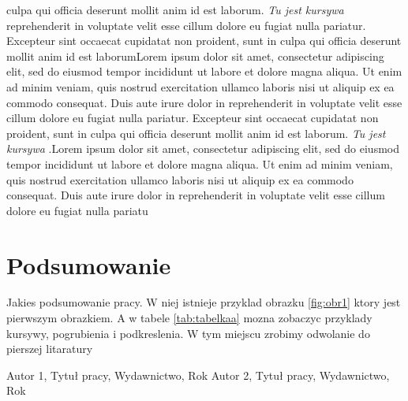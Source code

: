 \documentclass[12pt,a4paper,titlepage]{article}
\begin{document}
culpa qui officia deserunt mollit anim id est laborum.  \textit{Tu jest kursywa} reprehenderit in voluptate velit esse cillum dolore eu fugiat nulla pariatur. Excepteur sint occaecat cupidatat non proident, sunt in culpa qui officia deserunt mollit anim id est laborumLorem ipsum dolor sit amet, consectetur adipiscing elit, sed do eiusmod tempor incididunt ut labore et dolore magna aliqua.  Ut enim ad minim veniam, quis nostrud exercitation ullamco laboris nisi ut aliquip ex ea commodo consequat. Duis aute irure dolor in reprehenderit in voluptate velit esse cillum dolore eu fugiat nulla pariatur. Excepteur sint occaecat cupidatat non proident, sunt in culpa qui officia deserunt mollit anim id est laborum.  \textit{Tu jest kursywa} .Lorem ipsum dolor sit amet, consectetur adipiscing elit, sed do eiusmod tempor incididunt ut labore et dolore magna aliqua. Ut enim ad minim veniam, quis nostrud exercitation ullamco laboris nisi ut aliquip ex ea commodo consequat. Duis aute irure dolor in reprehenderit 
\cite{autor2} in voluptate velit esse cillum dolore eu fugiat nulla pariatu




\section{Podsumowanie}

Jakies podsumowanie pracy. W niej istnieje przyklad obrazku  \ref{fig:obr1} ktory jest pierwszym obrazkiem. A w tabele \ref{tab:tabelkaa}  mozna zobaczyc przyklady kursywy, pogrubienia i podkreslenia. W tym miejscu zrobimy odwolanie do pierszej litaratury \cite{autor1}


\begin{thebibliography}{2}
 Autor 1, Tytuł pracy, Wydawnictwo, Rok
 Autor 2, Tytuł pracy, Wydawnictwo, Rok



\end{thebibliography}
\end{document}
